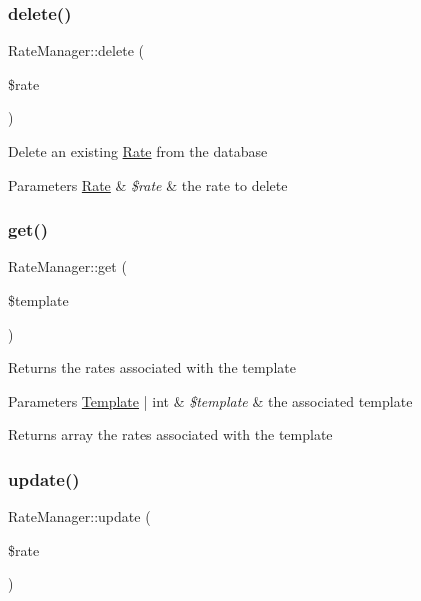\subsubsection{\texorpdfstring{delete()}{delete()}}
{\footnotesize\ttfamily Rate\+Manager\+::delete (\begin{DoxyParamCaption}\item[{}]{\$rate }\end{DoxyParamCaption})}

Delete an existing \hyperlink{classRate}{Rate} from the database 
\begin{DoxyParams}[1]{Parameters}
\hyperlink{classRate}{Rate} & {\em \$rate} & the rate to delete \\
\hline
\end{DoxyParams}
\mbox{\label{classRateManager_ad1c256b4d154cf02a5fda3cacb5efdc1}} 
\subsubsection{\texorpdfstring{get()}{get()}}
{\footnotesize\ttfamily Rate\+Manager\+::get (\begin{DoxyParamCaption}\item[{}]{\$template }\end{DoxyParamCaption})}

Returns the rates associated with the template 
\begin{DoxyParams}[1]{Parameters}
\hyperlink{classTemplate}{Template} | int & {\em \$template} & the associated template \\
\hline
\end{DoxyParams}
\begin{DoxyReturn}{Returns}
array the rates associated with the template 
\end{DoxyReturn}
\mbox{\label{classRateManager_a87dfbd80d02e6397d47aaf723f942eab}} 
\subsubsection{\texorpdfstring{update()}{update()}}
{\footnotesize\ttfamily Rate\+Manager\+::update (\begin{DoxyParamCaption}\item[{}]{\$rate }\end{DoxyParamCaption})}

